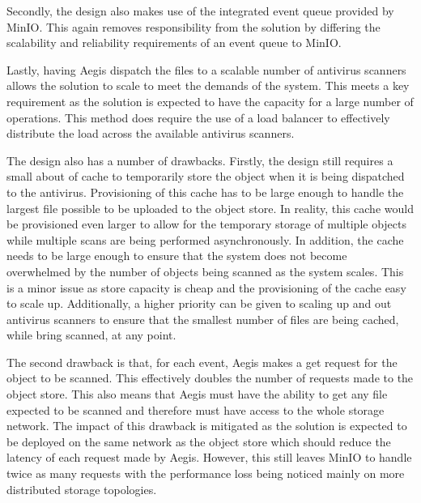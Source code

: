 \documentclass[12pt, conference, final, a4paper, onecolumn, compsoc]{IEEEtran}
\begin{document}
    Secondly, the design also makes use of the integrated event queue provided
    by MinIO. This again removes responsibility from the solution by differing
    the scalability and reliability requirements of an event queue to MinIO.


    Lastly, having Aegis dispatch the files to a scalable number of antivirus
    scanners allows the solution to scale to meet the demands of the system.
    This meets a key requirement as the solution is expected to have the
    capacity for a large number of operations. This method does require the use
    of a load balancer to effectively distribute the load across the available
    antivirus scanners.

    The design also has a number of drawbacks. Firstly, the design still
    requires a small about of cache to temporarily store the object when it is
    being dispatched to the antivirus. Provisioning of this cache has to be
    large enough to handle the largest file possible to be uploaded to the
    object store. In reality, this cache would be provisioned even larger to
    allow for the temporary storage of multiple objects while multiple scans are
    being performed asynchronously. In addition, the cache needs to be large
    enough to ensure that the system does not become overwhelmed by the number
    of objects being scanned as the system scales. This is a minor issue as
    store capacity is cheap and the provisioning of the cache easy to scale up.
    Additionally, a higher priority can be given to scaling up and out antivirus
    scanners to ensure that the smallest number of files are being cached, while
    bring scanned, at any point.


    The second drawback is that, for each event, Aegis makes a get request for
    the object to be scanned. This effectively doubles the number of requests
    made to the object store. This also means that Aegis must have the ability
    to get any file expected to be scanned and therefore must have access to the
    whole storage network. The impact of this drawback is mitigated as the
    solution is expected to be deployed on the same network as the object store
    which should reduce the latency of each request made by Aegis. However, this
    still leaves MinIO to handle twice as many requests with the performance
    loss being noticed mainly on more distributed storage topologies.
\end{document}
